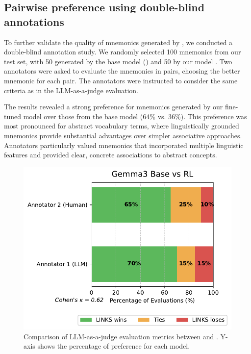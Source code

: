 \subsection{Pairwise preference using double-blind annotations} \label{sec:pairwise-preference}

To further validate the quality of mnemonics generated by \linksys, we conducted a double-blind annotation study. We randomly selected 100 mnemonics from our test set, with 50 generated by the base model (\studentmodel) and 50 by our model \linksys. Two annotators were asked to evaluate the mnemonics in pairs, choosing the better mnemonic for each pair. The annotators were instructed to consider the same criteria as in the LLM-as-a-judge evaluation.

The results revealed a strong preference for mnemonics generated by our fine-tuned model over those from the base model (64\% vs. 36\%). This preference was most pronounced for abstract vocabulary terms, where linguistically grounded mnemonics provide substantial advantages over simpler associative approaches. Annotators particularly valued mnemonics that incorporated multiple linguistic features and provided clear, concrete associations to abstract concepts.

\begin{figure}[htb]
  \centering
  \includegraphics[width=\linewidth]{figures/model_comparison.pdf}
  \caption{Comparison of LLM-as-a-judge evaluation metrics between \studentmodel and \linksys. Y-axis shows the percentage of preference for each model.}
  \label{fig:llm-judge-comparison}
\end{figure}

